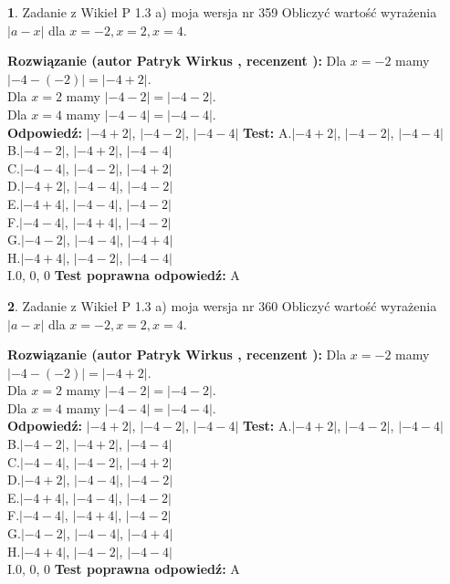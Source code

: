 \documentclass[12pt, a4paper]{article}
\theoremstyle{definition} %
\newtheorem{zad}{}
\newcommand{\zadStart}[1]{\begin{zad}#1\newline}
\newcommand{\zadStop}{\end{zad}}
\newcommand{\rozwStart}[2]{\noindent \textbf{Rozwiązanie (autor #1 , recenzent #2): }\newline}
\newcommand{\rozwStop}{\newline}
\newcommand{\odpStart}{\noindent \textbf{Odpowiedź:}\newline}
\newcommand{\odpStop}{\newline}
\newcommand{\testStart}{\noindent \textbf{Test:}\newline}
\newcommand{\testStop}{\newline}
\newcommand{\kluczStart}{\noindent \textbf{Test poprawna odpowiedź:}\newline}
\newcommand{\kluczStop}{\newline}
\begin{document}
\zadStart{Zadanie z Wikieł P 1.3 a) moja wersja nr 359}
Obliczyć wartość wyrażenia $|a - x|$ dla $x=-2,x=2,x=4$.
\zadStop
\rozwStart{Patryk Wirkus}{}
Dla $x = -2$ mamy $|-4 - (-2)| = |-4 + 2|$.\\
Dla $x = 2$ mamy $|-4 - 2| = |-4 - 2|$.\\
Dla $x = 4$ mamy $|-4 - 4| = |-4 - 4|$.\\
\rozwStop
\odpStart
$|-4 + 2|$, $|-4 - 2|$, $|-4 - 4|$
\odpStop
\testStart
A.$|-4 + 2|$, $|-4 - 2|$, $|-4 - 4|$\\
B.$|-4 - 2|$, $|-4 + 2|$, $|-4 - 4|$\\
C.$|-4 - 4|$, $|-4 - 2|$, $|-4 + 2|$\\
D.$|-4 + 2|$, $|-4 - 4|$, $|-4 - 2|$\\
E.$|-4 + 4|$, $|-4 - 4|$, $|-4 - 2|$\\
F.$|-4 - 4|$, $|-4 + 4|$, $|-4 - 2|$\\
G.$|-4 - 2|$, $|-4 - 4|$, $|-4 + 4|$\\
H.$|-4 + 4|$, $|-4 - 2|$, $|-4 - 4|$\\
I.$0$, $0$, $0$
\testStop
\kluczStart
A
\kluczStop



\zadStart{Zadanie z Wikieł P 1.3 a) moja wersja nr 360}
Obliczyć wartość wyrażenia $|a - x|$ dla $x=-2,x=2,x=4$.
\zadStop
\rozwStart{Patryk Wirkus}{}
Dla $x = -2$ mamy $|-4 - (-2)| = |-4 + 2|$.\\
Dla $x = 2$ mamy $|-4 - 2| = |-4 - 2|$.\\
Dla $x = 4$ mamy $|-4 - 4| = |-4 - 4|$.\\
\rozwStop
\odpStart
$|-4 + 2|$, $|-4 - 2|$, $|-4 - 4|$
\odpStop
\testStart
A.$|-4 + 2|$, $|-4 - 2|$, $|-4 - 4|$\\
B.$|-4 - 2|$, $|-4 + 2|$, $|-4 - 4|$\\
C.$|-4 - 4|$, $|-4 - 2|$, $|-4 + 2|$\\
D.$|-4 + 2|$, $|-4 - 4|$, $|-4 - 2|$\\
E.$|-4 + 4|$, $|-4 - 4|$, $|-4 - 2|$\\
F.$|-4 - 4|$, $|-4 + 4|$, $|-4 - 2|$\\
G.$|-4 - 2|$, $|-4 - 4|$, $|-4 + 4|$\\
H.$|-4 + 4|$, $|-4 - 2|$, $|-4 - 4|$\\
I.$0$, $0$, $0$
\testStop
\kluczStart
A
\kluczStop
\end{document}
